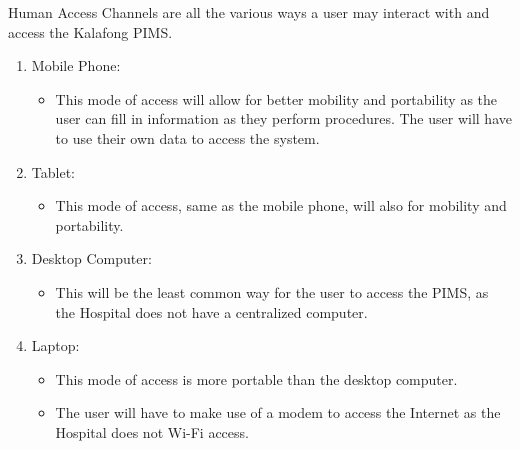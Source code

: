Human Access Channels are all the various ways a user may interact with and access the Kalafong PIMS.

\begin{enumerate}
	\item Mobile Phone:
	\begin{itemize}
		\item This mode of access will allow for better mobility and portability as the user can fill in information as they perform procedures. The user will have to use their own data to access the system.
	\end{itemize}
	\item Tablet:
	\begin{itemize}
		\item This mode of access, same as the mobile phone, will also for mobility and portability.
	\end{itemize}
	
	\item Desktop Computer:
	\begin{itemize}
		\item This will be the least common way for the user to access the PIMS, as the Hospital does not have a centralized computer.
	\end{itemize}
	\item Laptop:
	\begin{itemize}
		\item This mode of access is more portable than the desktop computer.
		\item The user will have to make use of a modem to access the Internet as the Hospital does not Wi-Fi access.
	\end{itemize}

\end{enumerate} 